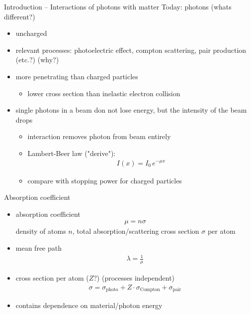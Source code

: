 \documentclass[11pt,xcolor=dvipsnames,professionalfonts]{beamer}
\begin{document}
\begin{frame}{Introduction -- Interactions of photons with matter}
	Today: photons (whats different?)
	\begin{itemize}
		\item uncharged
		
		\item relevant processes: photoelectric effect, compton scattering, pair production (etc.?) (why?)
		
		\item more penetrating than charged particles 
		\begin{itemize}
			\item lower cross section than inelastic electron collision
		\end{itemize}
		
		\item single photons in a beam don not lose energy, but the intensity of the beam drops
		\begin{itemize}
			\item interaction removes photon from beam entirely
			
			\item Lambert-Beer law ("derive"):
			\begin{align*}
				I(x) = I_0 \, e^{- \mu x}
			\end{align*}
			
			\item compare with stopping power for charged particles
		\end{itemize}
	\end{itemize}
\end{frame}

\begin{frame}{Absorption coefficient}
	\begin{itemize}
		\item absorption coefficient
		\begin{align*}
			\mu = n \sigma
		\end{align*}
		density of atoms $n$, total absorption/scattering cross section $\sigma$ per atom
		
		\item mean free path
		\begin{align*}
			\lambda = \frac{1}{\mu}
		\end{align*}
		
		\item cross section per atom ($Z$?) (processes independent)
		\begin{align*}
			\sigma = \sigma_\mathrm{photo} + Z \cdot \sigma_\mathrm{Compton} + \sigma_\mathrm{pair}
		\end{align*}
		
		\item contains dependence on material/photon energy
	\end{itemize}	
\end{frame}
\end{document}
